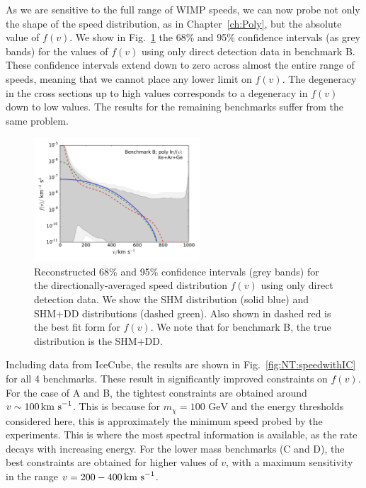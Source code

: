 As we are sensitive to the full range of WIMP speeds, we can now probe not only the shape of the speed distribution, as in Chapter~\ref{ch:Poly}, but the absolute value of $f(v)$. We show in Fig.~\ref{fig:NT:speedwithoutIC} the 68\% and 95\% confidence intervals (as grey bands) for the values of $f(v)$ using only direct detection data in benchmark B. These confidence intervals extend down to zero across almost the entire range of speeds, meaning that we cannot place any lower limit on $f(v)$. The degeneracy in the cross sections up to high values corresponds to a degeneracy in $f(v)$ down to low values. The results for the remaining benchmarks suffer from the same problem.

\begin{figure}[!ht]
  \centering
  \includegraphics[trim=0.5cm 0.5cm 0.5cm 0.5cm, clip,width=0.55\textwidth]{NT/BenchmarkB_poly_noIC-speed.pdf}
\caption[Reconstructed $f(v)$ using the polynomial $\ln f(v)$ parametrisation and direct detection data only for benchmark B]{Reconstructed 68\% and 95\% confidence intervals (grey bands) for the directionally-averaged speed distribution $f(v)$ using only direct detection data. We show the SHM distribution (solid blue) and SHM+DD distributions (dashed green). Also shown in dashed red is the best fit form for $f(v)$. We note that for benchmark B, the true distribution is the SHM+DD.}
\label{fig:NT:speedwithoutIC}
\end{figure}

Including data from IceCube, the results are shown in Fig.~\ref{fig:NT:speedwithIC} for all 4 benchmarks. These result in significantly improved constraints on $f(v)$. For the case of A and B, the tightest constraints are obtained around $v \sim 100 \,\textrm{km s}^{-1}$. This is because for $m_\chi = 100 \textrm{ GeV}$ and the energy thresholds considered here, this is approximately the minimum speed probed by the experiments. This is where the most spectral information is available, as the rate decays with increasing energy. For the lower mass benchmarks (C and D), the best constraints are obtained for higher values of $v$, with a maximum sensitivity in the range $v=200-400 \,\textrm{km s}^{-1}$.

